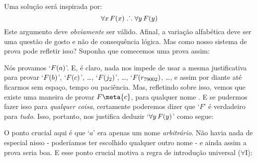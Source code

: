Uma solu\c c\~ao ser\'a inspirada por:
$$\forall x\,\mathord{F}(x) \mathrel{\ldotp\dot{}\,\ldotp} \forall y\,\mathord{F}(y)$$
Este argumento deve \emph{obviamente} ser v\'alido. Afinal, a varia\c c\~ao alfab\'etica deve ser uma quest\~ao de gosto e  n\~ao de consequ\^encia l\'ogica. Mas como nosso sistema de prova  pode refletir isso? Suponha que comecemos uma prova assim:
\begin{fitchproof}
	 
\end{fitchproof}
  N\'os provamos `$\mathord{F}(a)$'. E, \'e claro, nada nos impede de usar a mesma justificativa para provar `$\mathord{F}(b)$', `$\mathord{F}(c)$', \ldots, `$\mathord{F}(j_2)$', \ldots, `$\mathord{F}(r_{79002})$, \dots, e assim por diante at\'e ficarmos sem espa\c co, tempo ou paci\^encia. Mas, refletindo sobre isso, vemos que existe uma maneira de provar $F\meta{c}$, para qualquer nome . E se pudermos fazer isso para   \emph{qualquer coisa}, certamente poderemos dizer que  `$F$' \'e verdadeiro para \emph{tudo}. Isso, portanto, nos justifica deduzir `$\forall y\,\mathord{F}(y)$' como segue:
\begin{fitchproof}
	 
	 
\end{fitchproof}
O ponto crucial aqui \'e que `$a$' era apenas um nome   \emph{arbitr\'ario}. N\~ao havia nada de especial nisso - poder\'iamos ter escolhido qualquer outro nome - e ainda assim a prova seria boa. E esse ponto crucial motiva a regra de introdu\c c\~ao  universal ($\forall$I):

